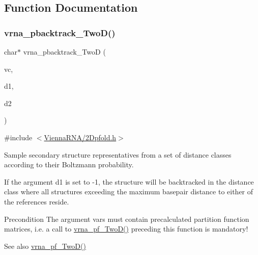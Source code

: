 \subsection{Function Documentation}
\mbox{\label{group__kl__neighborhood__stochbt_ga14aceef73f83bbde77bb3a0ca06c9d13}} 
\subsubsection{\texorpdfstring{vrna\+\_\+pbacktrack\+\_\+\+Two\+D()}{vrna\_pbacktrack\_TwoD()}}
{\footnotesize\ttfamily char$\ast$ vrna\+\_\+pbacktrack\+\_\+\+TwoD (\begin{DoxyParamCaption}\item[{\mbox{\hyperlink{group__fold__compound_ga1b0cef17fd40466cef5968eaeeff6166}{vrna\+\_\+fold\+\_\+compound\+\_\+t}} $\ast$}]{vc,  }\item[{int}]{d1,  }\item[{int}]{d2 }\end{DoxyParamCaption})}



{\ttfamily \#include $<$\mbox{\hyperlink{2_dpfold_8h}{Vienna\+R\+N\+A/2\+Dpfold.\+h}}$>$}



Sample secondary structure representatives from a set of distance classes according to their Boltzmann probability. 

If the argument \textquotesingle{}d1\textquotesingle{} is set to \textquotesingle{}-\/1\textquotesingle{}, the structure will be backtracked in the distance class where all structures exceeding the maximum basepair distance to either of the references reside.

\begin{DoxyPrecond}{Precondition}
The argument \textquotesingle{}vars\textquotesingle{} must contain precalculated partition function matrices, i.\+e. a call to \mbox{\hyperlink{group__kl__neighborhood__pf_ga0bc3427689bd09da09b8b3094a27f836}{vrna\+\_\+pf\+\_\+\+Two\+D()}} preceding this function is mandatory!
\end{DoxyPrecond}
\begin{DoxySeeAlso}{See also}
\mbox{\hyperlink{group__kl__neighborhood__pf_ga0bc3427689bd09da09b8b3094a27f836}{vrna\+\_\+pf\+\_\+\+Two\+D()}}
\end{DoxySeeAlso}


